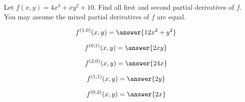 \documentclass{ximera}
\author{David Guichard \and Neal Koblitz \and H. Jerome Keisler \and Albert Scheller \and Barry Balof \and Mike Wills \and Matthew Carr}
\begin{document}
\begin{exercise}




Let $f(x,y)=4x^3+xy^2+10$. Find all first and second partial derivatives of $f$. You may assume the mixed partial derivatives of $f$ are equal.

\begin{prompt}
\[
f^{(1,0)}(x,y)=\answer{12x^2+y^2}
\]
\end{prompt}
\begin{prompt}
\[
f^{(0,1)}(x,y)=\answer{2xy}
\]
\end{prompt}
\begin{prompt}
\[
f^{(2,0)}(x,y)=\answer{24x}
\]
\end{prompt}
\begin{prompt}
\[
f^{(1,1)}(x,y)=\answer{2y}
\]
\end{prompt}
\begin{prompt}
\[
f^{(0,2)}(x,y)=\answer{2x}
\]
\end{prompt}

\end{exercise}
\end{document}
